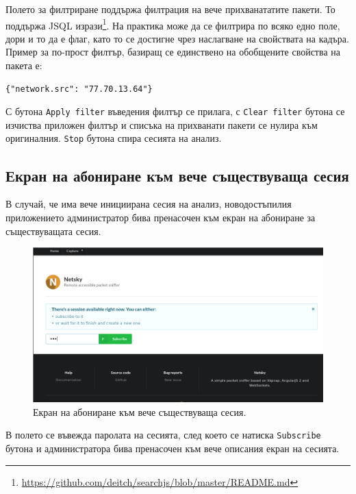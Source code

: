 \documentclass[12pt,a4paper,oneside]{book}
\begin{document}
Полето за филтриране поддържа филтрация на вече прихванататите пакети. То
поддържа JSQL
изрази\footnote{\url{https://github.com/deitch/searchjs/blob/master/README.md}}.
На практика може да се филтрира по всяко
едно поле, дори и то да е флаг, като то се достигне чрез наслагване на
свойствата на кадъра. Пример за по-прост филтър, базиращ се единствено на
обобщените свойства на пакета е:

\begin{lstlisting}[caption={Филтър, извеждащ само пакети с
  IP адрес на подателя \texttt{77.70.13.64}}]
  {"network.src": "77.70.13.64"}
\end{lstlisting}

С бутона \texttt{Apply filter} въведения филтър се
прилага, с \texttt{Clear filter} бутона се изчиства приложен филтър и списъка на
прихванати пакети се нулира към оригиналния. \texttt{Stop} бутона спира сесията
на анализ.

\subsection{Екран на абониране към вече съществуваща сесия}

В случай, че има вече инициирана сесия на анализ, новодостъпилия приложението
администратор бива пренасочен към екран на абониране за съществуващата сесия.

\begin{figure}[h!]
  \centering
  \includegraphics[width=\textwidth]{figures/screenshots/session-subscription.png}
  \caption{Екран на абониране към вече съществуваща сесия.}
  \label{capture_fig}
\end{figure}

В полето се въвежда паролата на сесията, след което се натиска
\texttt{Subscribe} бутона и администратора бива пренасочен към вече описания
екран на сесията.
\end{document}
